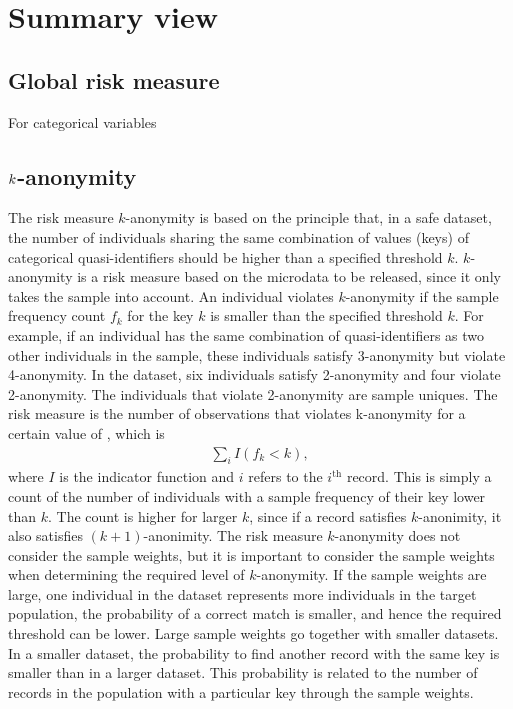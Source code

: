 \documentclass[letterpaper,10pt,english]{sphinxmanual}
\begin{document}
\section{Summary view}
\label{\detokenize{risk:summary-view}}

\subsection{Global risk measure}
\label{\detokenize{risk:global-risk-measure}}
For categorical variables


\subsection{\protect\(k\protect\)-anonymity}
\label{\detokenize{risk:anonymity}}
The risk measure \(k\)-anonymity is based on the principle that, in a safe
dataset, the number of individuals sharing the same combination of
values (keys) of categorical quasi-identifiers should be higher than a
specified threshold \(k\). \(k\)-anonymity is a risk
measure based on the microdata to be released, since it only takes the
sample into account. An individual violates \(k\)-anonymity if the
sample frequency count \(f_{k}\) for the key \(k\) is smaller
than the specified threshold \(k\). For example, if an
individual has the same combination of quasi-identifiers as two other
individuals in the sample, these individuals satisfy 3-anonymity but
violate 4-anonymity. In the dataset, six individuals
satisfy 2-anonymity and four violate 2-anonymity. The individuals that
violate 2-anonymity are sample uniques. The risk measure is the number
of observations that violates k-anonymity for a certain value of ,
which is
\begin{equation*}
\begin{split}\sum_{i}^{}{I(f_{k} < k)},\end{split}
\end{equation*}
where \(I\) is the indicator function and \(i\) refers to the
\(i\)$^{\text{th}}$ record. This is simply a count of the number of
individuals with a sample frequency of their key lower than \(k\).
The count is higher for larger \(k\), since if a record satisfies
\(k\)-anonimity, it also satisfies \((k + 1)\)-anonimity. The
risk measure \(k\)-anonymity does not consider the sample weights,
but it is important to consider the sample weights when determining the
required level of \(k\)-anonymity. If the sample weights are large,
one individual in the dataset represents more individuals in the target
population, the probability of a correct match is smaller, and hence the
required threshold can be lower. Large sample weights go together with
smaller datasets. In a smaller dataset, the probability to find another
record with the same key is smaller than in a larger dataset. This
probability is related to the number of records in the population with a
particular key through the sample weights.
\end{document}

